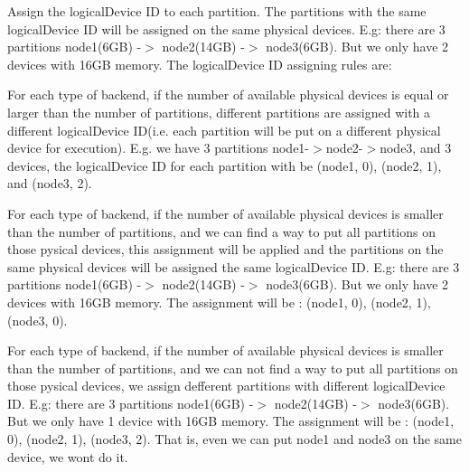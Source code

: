 Assign the logical\+Device ID to each partition. The partitions with the same logical\+Device ID will be assigned on the same physical devices. E.\+g\+: there are 3 partitions node1(6\+G\+B) -\/$>$ node2(14\+G\+B) -\/$>$ node3(6\+G\+B). But we only have 2 devices with 16\+GB memory. The logical\+Device ID assigning rules are\+:
\begin{DoxyEnumerate}
\item For each type of backend, if the number of available physical devices is equal or larger than the number of partitions, different partitions are assigned with a different logical\+Device ID(i.\+e. each partition will be put on a different physical device for execution). E.\+g. we have 3 partitions node1-\/$>$node2-\/$>$node3, and 3 devices, the logical\+Device ID for each partition with be (node1, 0), (node2, 1), and (node3, 2).
\item For each type of backend, if the number of available physical devices is smaller than the number of partitions, and we can find a way to put all partitions on those pysical devices, this assignment will be applied and the partitions on the same physical devices will be assigned the same logical\+Device ID. E.\+g\+: there are 3 partitions node1(6\+G\+B) -\/$>$ node2(14\+G\+B) -\/$>$ node3(6\+G\+B). But we only have 2 devices with 16\+GB memory. The assignment will be \+: (node1, 0), (node2, 1), (node3, 0).
\item For each type of backend, if the number of available physical devices is smaller than the number of partitions, and we can not find a way to put all partitions on those pysical devices, we assign defferent partitions with different logical\+Device ID. E.\+g\+: there are 3 partitions node1(6\+G\+B) -\/$>$ node2(14\+G\+B) -\/$>$ node3(6\+G\+B). But we only have 1 device with 16\+GB memory. The assignment will be \+: (node1, 0), (node2, 1), (node3, 2). That is, even we can put node1 and node3 on the same device, we won\textquotesingle{}t do it. 
\end{DoxyEnumerate}\mbox{\label{namespaceglow_a110f6a4f4c9801ecca0c96826b3888ff}} 
